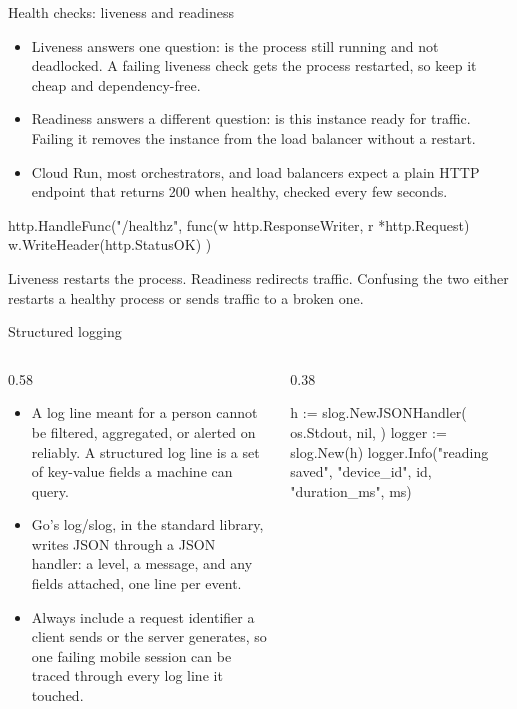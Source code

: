 \documentclass[10pt,aspectratio=169,t]{beamer}
\begin{document}
\begin{frame}[fragile,eyebrow=Deploying]{Health checks: liveness and readiness}
  \vskip 1mm
  \begin{itemize}
    \item Liveness answers one question: is the process still running and not deadlocked. A failing liveness check gets the process restarted, so keep it cheap and dependency-free.
    \item Readiness answers a different question: is this instance ready for traffic. Failing it removes the instance from the load balancer without a restart.
    \item Cloud Run, most orchestrators, and load balancers expect a plain HTTP endpoint that returns 200 when healthy, checked every few seconds.
  \end{itemize}
\begin{golang}
http.HandleFunc("/healthz", func(w http.ResponseWriter, r *http.Request) {
    w.WriteHeader(http.StatusOK)
})
\end{golang}
  \begin{takeaway}{Liveness restarts the process. Readiness redirects traffic.}
    Confusing the two either restarts a healthy process or sends traffic to a broken one.
  \end{takeaway}
\end{frame}

\begin{frame}[fragile,eyebrow=Deploying]{Structured logging}
  \begin{columns}[T]
    \begin{column}{0.58\textwidth}
      \begin{itemize}
        \item A log line meant for a person cannot be filtered, aggregated, or alerted on reliably. A structured log line is a set of key-value fields a machine can query.
        \item Go's log/slog, in the standard library, writes JSON through a JSON handler: a level, a message, and any fields attached, one line per event.
        \item Always include a request identifier a client sends or the server generates, so one failing mobile session can be traced through every log line it touched.
      \end{itemize}
    \end{column}
    \begin{column}{0.38\textwidth}
\begin{golang}
h := slog.NewJSONHandler(
  os.Stdout, nil,
)
logger := slog.New(h)
logger.Info("reading saved",
  "device_id", id,
  "duration_ms", ms)
\end{golang}
    \end{column}
  \end{columns}
\end{frame}
\end{document}
